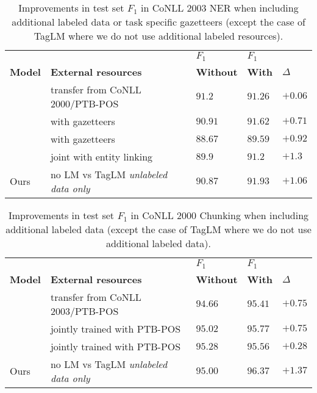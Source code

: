 \documentclass[11pt,a4paper]{article}
\begin{document}
\begin{table*}[t]
\begin{center}
\begin{tabular}{l|p{2.4in}|l|l|l}
\hline \hline
          &                        & $F_1$ & $F_1$ & \\
\bf Model & \bf External resources & \bf Without & \bf With & $\Delta$ \\ \hline
\citet{yang-transfer-iclr07} & transfer from CoNLL 2000/PTB-POS & $91.2$ & $91.26$ & $+0.06$ \\
\citet{chiu-nichols-2016} & with gazetteers & $90.91$ & $91.62$ & $+0.71$ \\
\citet{NLPfromScratch:Collobert2011} & with gazetteers & $88.67$ & $89.59$ & $+0.92$ \\
\citet{luo-EtAl:2015:EMNLP2} & joint with entity linking & $89.9$ & $91.2$ & $\mathbf{+1.3}$ \\
\hline
Ours & no LM vs TagLM \textit{unlabeled data only} & $90.87$ & $\mathbf{91.93}$ & $+1.06$ \\
\hline \hline
\end{tabular}
\end{center}
\caption{\label{2003-table-aux} Improvements in test set $F_1$ in CoNLL 2003 NER when including
additional labeled data or task specific gazetteers (except the case of TagLM where we do not use additional labeled resources).}
\end{table*}


\begin{table*}[t]
\begin{center}
\begin{tabular}{l|p{2.4in}|l|l|l}
\hline \hline
          &                        & $F_1$ & $F_1$ & \\
\bf Model & \bf External resources & \bf Without & \bf With & $\Delta$ \\ \hline
\citet{yang-transfer-iclr07} & transfer from CoNLL 2003/PTB-POS & $94.66$ & $95.41$ & $+0.75$ \\
\citet{joint-many-iclr07} & jointly trained with PTB-POS & $95.02$ & $95.77$ & $+0.75$ \\
\citet{Sgaard2016DeepML} & jointly trained with PTB-POS & $95.28$ & $95.56$ & $+0.28$ \\
\hline
Ours & no LM vs TagLM \textit{unlabeled data only} & $95.00$ & $\mathbf{96.37}$ & $\mathbf{+1.37}$ \\
\hline \hline
\end{tabular}
\end{center}
\caption{\label{2000-table-aux} Improvements in test set $F_1$ in CoNLL 2000 Chunking when including additional labeled data (except the case of TagLM where we do not use additional labeled data).}
\end{table*}
\end{document}
